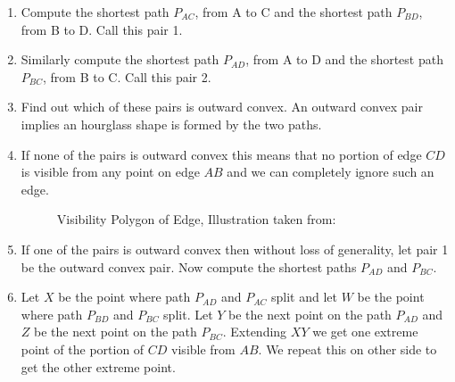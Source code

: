 \documentclass[a4paper,10pt]{article}
\begin{document}
\begin{enumerate}
\item
Compute the shortest path $P_{AC}$, from A to C and the shortest path $P_{BD}$, from B to D. Call this pair 1.
\item
Similarly compute the shortest path  $P_{AD}$, from A to D and the shortest path  $P_{BC}$,  from B to C. Call this pair 2.
\item
Find out which of these pairs is outward convex. An outward convex pair implies an hourglass shape is formed by the two paths.
\item
If none of the pairs is outward convex this means that no portion of edge $CD$ is visible from any point on edge $AB$ and we can 
completely ignore such an edge.

\begin{figure}[h]
\begin{center}
\caption{\label{fig:Visibility Polygon of Edge}Visibility Polygon of Edge, Illustration taken from:\cite{key3}}
\end{center}
\end{figure}

\item
If one of the pairs is outward convex then without loss of generality, let pair 1 be the outward convex pair. Now compute the shortest 
paths  $P_{AD}$ and  $P_{BC}$.

\item
Let $X$ be the point where path $P_{AD}$ and $P_{AC}$ split and let  $W$ be the point where path $P_{BD}$ and $P_{BC}$ split. Let $Y$ be
the next point on the path  $P_{AD}$ and $Z$ be the next point on the path   $P_{BC}$. Extending $XY$ we get one extreme point of the 
portion of $CD$ visible from $AB$. We repeat this on other side to get the other extreme point.


\end{enumerate}
\end{document}
